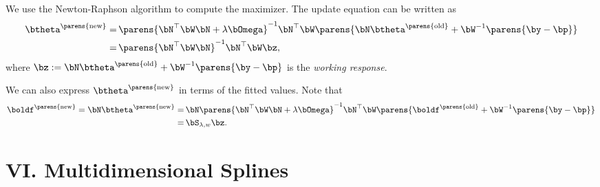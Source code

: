 \documentclass[12pt]{article}
\begin{document}
\begin{enumerate}[label=\textbf{\arabic*.}]
	We use the Newton-Raphson algorithm to compute the maximizer. The update equation can be written as 
	\begin{align*}
		\btheta^{\parens{\text{new}}} = & \, \parens{\bN^\top \bW \bN + \lambda \bOmega}^{-1} \bN^\top \bW \parens{\bN \btheta^{\parens{\text{old}}} + \bW^{-1} \parens{\by - \bp}} \nonumber \\ 
		= & \, \parens{\bN^\top \bW \bN}^{-1} \bN^\top \bW \bz, 
	\end{align*}
	where $\bz := \bN \btheta^{\parens{\text{old}}} + \bW^{-1} \parens{\by - \bp}$ is the \emph{working response}. 
	
	We can also express $\btheta^{\parens{\text{new}}}$ in terms of the fitted values. Note that 
	\begin{align*}
		\boldf^{\parens{\text{new}}} = \bN \btheta^{\parens{\text{new}}} = & \, \bN \parens{\bN^\top \bW \bN + \lambda \bOmega}^{-1} \bN^\top \bW \parens{\boldf^{\parens{\text{old}}} + \bW^{-1} \parens{\by - \bp}} \\ 
		= & \, \bS_{\lambda, w} \bz. 
	\end{align*}
\end{enumerate}


\section*{VI. Multidimensional Splines}
\end{document}
